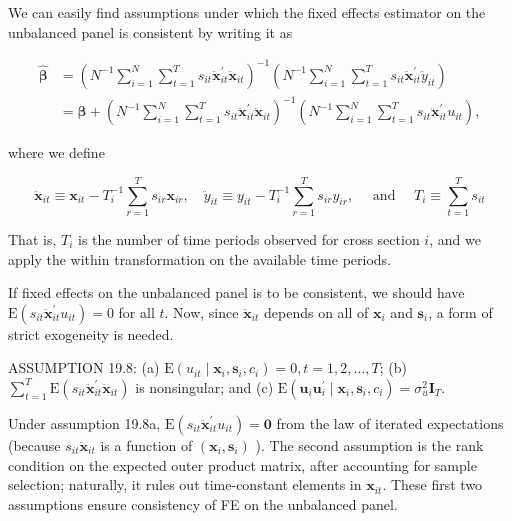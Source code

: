 \documentclass[10pt]{article}
\begin{document}
We can easily find assumptions under which the fixed effects estimator on the unbalanced panel is consistent by writing it as


\begin{align*}
\hat{\boldsymbol{\beta}} & =\left(N^{-1} \sum_{i=1}^{N} \sum_{t=1}^{T} s_{i t} \ddot{\mathbf{x}}_{i t}^{\prime} \ddot{\mathbf{x}}_{i t}\right)^{-1}\left(N^{-1} \sum_{i=1}^{N} \sum_{t=1}^{T} s_{i t} \ddot{\mathbf{x}}_{i t}^{\prime} \ddot{y}_{i t}\right) \\
& =\boldsymbol{\beta}+\left(N^{-1} \sum_{i=1}^{N} \sum_{t=1}^{T} s_{i t} \ddot{\mathbf{x}}_{i t}^{\prime} \ddot{\mathbf{x}}_{i t}\right)^{-1}\left(N^{-1} \sum_{i=1}^{N} \sum_{t=1}^{T} s_{i t} \ddot{\mathbf{x}}_{i t}^{\prime} u_{i t}\right), \tag{19.96}
\end{align*}


where we define

$$
\ddot{\mathbf{x}}_{i t} \equiv \mathbf{x}_{i t}-T_{i}^{-1} \sum_{r=1}^{T} s_{i r} \mathbf{x}_{i r}, \quad \ddot{y}_{i t} \equiv y_{i t}-T_{i}^{-1} \sum_{r=1}^{T} s_{i r} y_{i r}, \quad \text { and } \quad T_{i} \equiv \sum_{t=1}^{T} s_{i t}
$$

That is, $T_{i}$ is the number of time periods observed for cross section $i$, and we apply the within transformation on the available time periods.

If fixed effects on the unbalanced panel is to be consistent, we should have $\mathrm{E}\left(s_{i t} \ddot{\mathbf{x}}_{i t}^{\prime} u_{i t}\right)=0$ for all $t$. Now, since $\ddot{\mathbf{x}}_{i t}$ depends on all of $\mathbf{x}_{i}$ and $\mathbf{s}_{i}$, a form of strict exogeneity is needed.

ASSUMPTION 19.8: (a) $\mathrm{E}\left(u_{i t} \mid \mathbf{x}_{i}, \mathbf{s}_{i}, c_{i}\right)=0, t=1,2, \ldots, T$; (b) $\sum_{t=1}^{T} \mathrm{E}\left(s_{i t} \ddot{\mathbf{x}}_{i t}^{\prime} \ddot{\mathbf{x}}_{i t}\right)$ is nonsingular; and (c) $\mathrm{E}\left(\mathbf{u}_{i} \mathbf{u}_{i}^{\prime} \mid \mathbf{x}_{i}, \mathbf{s}_{i}, c_{i}\right)=\sigma_{u}^{2} \mathbf{I}_{T}$.

Under assumption 19.8a, $\mathrm{E}\left(s_{i t} \ddot{\mathbf{x}}_{i t}^{\prime} u_{i t}\right)=\mathbf{0}$ from the law of iterated expectations (because $s_{i t} \ddot{\mathbf{x}}_{i t}$ is a function of $\left(\mathbf{x}_{i}, \mathbf{s}_{i}\right)$ ). The second assumption is the rank condition on the expected outer product matrix, after accounting for sample selection; naturally, it rules out time-constant elements in $\mathbf{x}_{i t}$. These first two assumptions ensure consistency of FE on the unbalanced panel.
\end{document}

